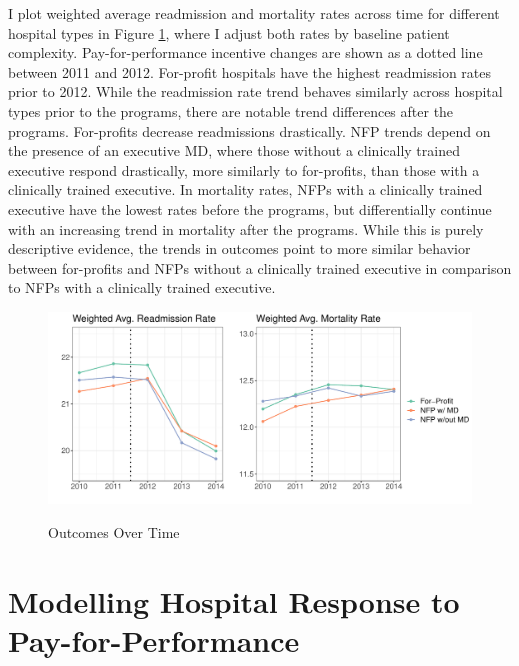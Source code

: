 \documentclass[12pt]{article}
\begin{document}
    I plot weighted average readmission and mortality rates across time for different hospital types in Figure \ref{fig:weighted_read_mort_graph}, where I adjust both rates by baseline patient complexity. Pay-for-performance incentive changes are shown as a dotted line between 2011 and 2012. For-profit hospitals have the highest readmission rates prior to 2012. While the readmission rate trend behaves similarly across hospital types prior to the programs, there are notable trend differences after the programs. For-profits decrease readmissions drastically. NFP trends depend on the presence of an executive MD, where those without a clinically trained executive respond drastically, more similarly to for-profits, than those with a clinically trained executive. In mortality rates, NFPs with a clinically trained executive have the lowest rates before the programs, but differentially continue with an increasing trend in mortality after the programs. While this is purely descriptive evidence, the trends in outcomes point to more similar behavior between for-profits and NFPs without a clinically trained executive in comparison to NFPs with a clinically trained executive.

    \begin{figure}[ht!]
    \centering
        \caption{Outcomes Over Time}
        \includegraphics[width=\textwidth]{Objects/weighted_read_mort_adjusted_graph.pdf}
        \label{fig:weighted_read_mort_graph}
    \end{figure}


    \section{Modelling Hospital Response to Pay-for-Performance}\label{sec:model}
\end{document}
